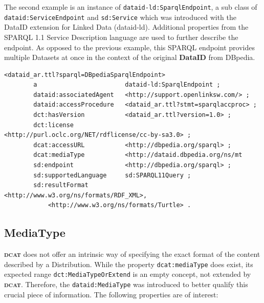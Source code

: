 \documentclass[a4paper,english,twoside,BCOR1.5cm,headsepline,DIV12,appendixprefix,final,12pt]{scrbook}
\newcommand{\dataid}{{\ttfamily\bfseries DataID}\xspace}
\newcommand{\dcat}{{\scshape\bfseries dcat}\xspace}
\newcommand{\prop}[1]{{{\texttt{#1}}}}
\begin{document}
The second example is an instance of \prop{dataid-ld:SparqlEndpoint}, a sub class of \prop{dataid:ServiceEndpoint} and \prop{sd:Service} which was introduced with the DataID extension for Linked Data (dataid-ld). Additional properties from the SPARQL 1.1 Service Description language are used to further describe the endpoint. As opposed to the previous example, this SPARQL endpoint provides multiple Datasets at once in the context of the original \dataid from DBpedia.
\\
\begin{lstlisting}[language=ttl, captionpos=b,caption=Distribution of a SPARQL endpoint,label=lst:coresuperset,linewidth=\columnwidth,breaklines=true]
<dataid_ar.ttl?sparql=DBpediaSparqlEndpoint>
        a                        dataid-ld:SparqlEndpoint ;
        dataid:associatedAgent   <http://support.openlinksw.com/> ;                                               
        dataid:accessProcedure   <dataid_ar.ttl?stmt=sparqlaccproc> ;                                             
        dct:hasVersion           <dataid_ar.ttl?version=1.0> ;
        dct:license              <http://purl.oclc.org/NET/rdflicense/cc-by-sa3.0> ;
        dcat:accessURL           <http://dbpedia.org/sparql> ;                                                    
        dcat:mediaType           <http://dataid.dbpedia.org/ns/mt
        sd:endpoint              <http://dbpedia.org/sparql> ;                                                    
        sd:supportedLanguage     sd:SPARQL11Query ;                                                               
        sd:resultFormat          <http://www.w3.org/ns/formats/RDF_XML>,                                          
            <http://www.w3.org/ns/formats/Turtle> .  
\end{lstlisting}

\subsection{MediaType} 
\label{sec:coremediatype}
\dcat does not offer an intrinsic way of specifying the exact format of the content described by a Distribution. While the property \prop{dcat:mediaType} does exist, its expected range \prop{dct:MediaTypeOrExtend} is an empty concept, not extended by \dcat. Therefore, the \prop{dataid:MediaType} was introduced to better qualify this crucial piece of information. The following properties are of interest:
\end{document}
